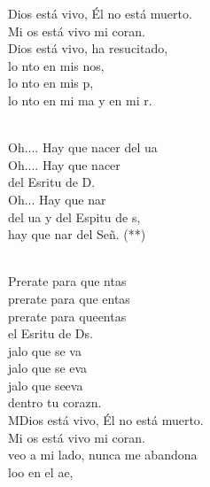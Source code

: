 \documentclass[12pt]{article}
\begin{document}
\begin{multicols*}{2}
\begin{cancion}%
	 Dios está vivo, Él no está muerto.\\
	Mi os está vivo mi coran. \\
	 Dios está vivo, ha resucitado,\\
	lo nto en mis nos,\\
	lo nto en mis p,\\
	lo nto en mi ma y en mi r.\\\jump\\
	\begin{chorus}%
	Oh.... Hay que nacer del ua\\
	Oh.... Hay que nacer\\
	del Esritu de D. \\
	Oh... Hay que nar\\
	del ua y del Espitu de s,\\
	hay que nar del Señ. (**) \\
	\end{chorus}%
	\jump\\
	Prerate para que ntas \\
	prerate para que entas \\
	prerate para queentas\\
	el Esritu de Ds. \\
	jalo que se va \\
	jalo que se eva \\
	jalo que seeva\\
	dentro  tu corazn.\\
	MDios está vivo, Él no está muerto.\\
	Mi os está vivo mi coran. \\
	 veo a mi lado, nunca me abandona\\
	loo en el ae,\\

\end{cancion}
\end{multicols*}
\end{document}
